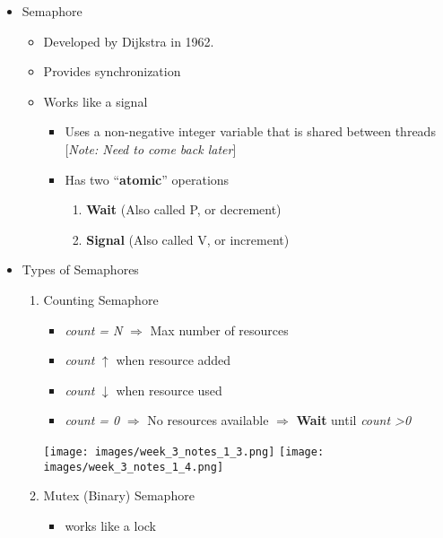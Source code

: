 \documentclass[12pt]{article}
\begin{document}
\begin{itemize}
    \item Semaphore
    \begin{itemize}
        \item Developed by Dijkstra in 1962.
        \item Provides synchronization
        \item Works like a signal
        \begin{itemize}
            \item Uses a non-negative integer variable that is shared between threads
            [\textit{Note: Need to come back later}]
            \item Has two ``\textbf{atomic}'' operations
            \begin{enumerate}[1.]
                \item \textbf{Wait} (Also called P, or decrement)
                \item \textbf{Signal} (Also called V, or increment)
            \end{enumerate}
        \end{itemize}
    \end{itemize}

    \item Types of Semaphores
    \begin{enumerate}[1.]
        \item Counting Semaphore
        \begin{itemize}
            \item \textit{count = N} $\Rightarrow$ Max number of resources
            \item \textit{count} $\uparrow$ when resource added
            \item \textit{count} $\downarrow$ when resource used
            \item \textit{count = 0} $\Rightarrow$ No resources available $\Rightarrow$ \textbf{Wait} until \textit{count \textgreater 0}
        \end{itemize}

        \begin{center}
        \texttt{[image: images/week\_3\_notes\_1\_3.png]}
        \texttt{[image: images/week\_3\_notes\_1\_4.png]}
        \end{center}

        \item Mutex (Binary) Semaphore
        \begin{itemize}
            \item works like a lock
        \end{itemize}
    \end{enumerate}
\end{itemize}

\bigskip
\end{document}
